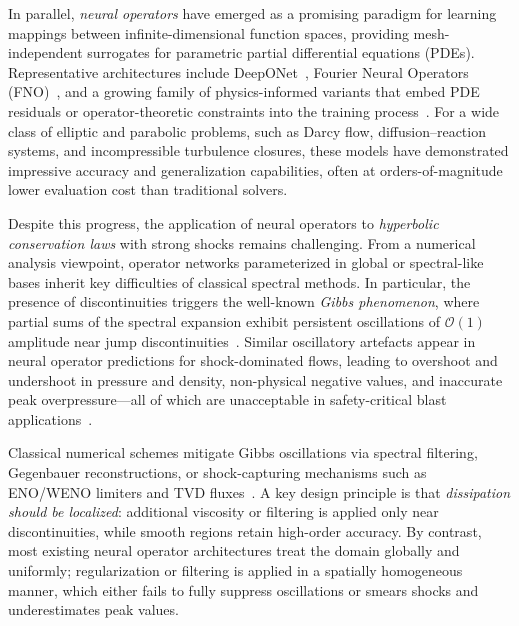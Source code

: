 \documentclass[a4paper,fleqn]{cas-dc}
\begin{document}
In parallel, \emph{neural operators} have emerged as a promising paradigm for learning mappings between infinite-dimensional function spaces, providing mesh-independent surrogates for parametric partial differential equations (PDEs).
Representative architectures include DeepONet~\citep{Lu2021DeepONet}, Fourier Neural Operators (FNO)~\citep{Li2021FNO}, and a growing family of physics-informed variants that embed PDE residuals or operator-theoretic constraints into the training process~\citep{Kovachki2023NeuralOperator,Karniadakis2021MachineLearningPDE,Cuomo2022PINNSurvey}.
For a wide class of elliptic and parabolic problems, such as Darcy flow, diffusion--reaction systems, and incompressible turbulence closures, these models have demonstrated impressive accuracy and generalization capabilities, often at orders-of-magnitude lower evaluation cost than traditional solvers.

Despite this progress, the application of neural operators to \emph{hyperbolic conservation laws} with strong shocks remains challenging.
From a numerical analysis viewpoint, operator networks parameterized in global or spectral-like bases inherit key difficulties of classical spectral methods.
In particular, the presence of discontinuities triggers the well-known \emph{Gibbs phenomenon}, where partial sums of the spectral expansion exhibit persistent oscillations of $\mathcal{O}(1)$ amplitude near jump discontinuities~\citep{Gottlieb2011GibbsReview,Canuto1988Spectral}.
Similar oscillatory artefacts appear in neural operator predictions for shock-dominated flows, leading to overshoot and undershoot in pressure and density, non-physical negative values, and inaccurate peak overpressure---all of which are unacceptable in safety-critical blast applications~\citep{Mishra2022HyperbolicNN,Brunton2020DataDrivenPDE}.

Classical numerical schemes mitigate Gibbs oscillations via spectral filtering, Gegenbauer reconstructions, or shock-capturing mechanisms such as ENO/WENO limiters and TVD fluxes~\citep{ShuOsher1988ENO,JiangShu1996WENO,Tadmor1989SpectralViscosity}.
A key design principle is that \emph{dissipation should be localized}: additional viscosity or filtering is applied only near discontinuities, while smooth regions retain high-order accuracy.
By contrast, most existing neural operator architectures treat the domain globally and uniformly; regularization or filtering is applied in a spatially homogeneous manner, which either fails to fully suppress oscillations or smears shocks and underestimates peak values.
\end{document}
